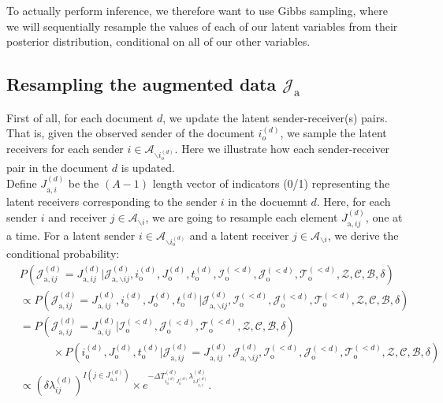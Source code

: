 \documentclass[a4paper]{article}
\begin{document}
 To actually perform inference, we therefore want to use Gibbs sampling, where we will sequentially resample the values of each of our latent variables from their posterior distribution, conditional on all of our other variables.
    \subsection{Resampling the augmented data $\mathcal{J}_{\mbox{a}}$} \label{subsec: Data augmentation}
      First of all, for each document $d$, we update the latent sender-receiver(s) pairs. That is, given the observed sender of the document $i_o^{(d)}$, we sample the latent receivers for each sender $i \in \mathcal{A}_{\backslash i_o^{(d)}}$. Here we illustrate how each sender-receiver pair in the document $d$ is updated.\\\newline
      Define ${J}^{(d)}_{\mbox{a}, i}$ be the $(A-1)$ length vector of indicators (0/1) representing the latent receivers corresponding to the sender $i$ in the docuemnt $d$. Here, for each sender $i$ and receiver  $j \in \mathcal{A}_{\backslash i}$, we are going to resample each element ${J}^{(d)}_{\mbox{a}, ij}$, one at a time. For a latent sender $i \in \mathcal{A}_{\backslash i_o^{(d)}}$ and a latent receiver $j \in \mathcal{A}_{\backslash i}$, we derive the conditional probability:\\
      \begin{equation}
      \begin{aligned}
      &P(\mathcal{J}^{(d)}_{\mbox{a}, ij} = {J}^{(d)}_{\mbox{a}, ij}|\mathcal{J}^{(d)}_{\mbox{a}, \backslash ij},   i^{(d)}_{\mbox{o}}, J^{(d)}_{\mbox{o}}, t^{(d)}_{\mbox{o}}, \mathcal{I}^{(<d)}_{\mbox{o}}, \mathcal{J}^{(<d)}_{\mbox{o}}, \mathcal{T}^{(<d)}_{\mbox{o}}, \mathcal{Z}, \mathcal{C}, \mathcal{B}, \delta)\\&\propto P(\mathcal{J}^{(d)}_{\mbox{a}, ij} ={J}^{(d)}_{\mbox{a}, ij}, i^{(d)}_{\mbox{o}}, J^{(d)}_{\mbox{o}}, t^{(d)}_{\mbox{o}}| \mathcal{J}^{(d)}_{\mbox{a}, \backslash ij}, \mathcal{I}^{(<d)}_{\mbox{o}}, \mathcal{J}^{(<d)}_{\mbox{o}}, \mathcal{T}^{(<d)}_{\mbox{o}}, \mathcal{Z}, \mathcal{C}, \mathcal{B}, \delta)
      \\&= P(\mathcal{J}^{(d)}_{\mbox{a}, ij} ={J}^{(d)}_{\mbox{a}, ij}| \mathcal{I}^{(<d)}_{\mbox{o}}, \mathcal{J}^{(<d)}_{\mbox{o}}, \mathcal{T}^{(<d)}_{\mbox{o}}, \mathcal{Z}, \mathcal{C}, \mathcal{B}, \delta)\\&\quad\quad\quad\times P(i^{(d)}_{\mbox{o}}, J^{(d)}_{\mbox{o}}, t^{(d)}_{\mbox{o}}| \mathcal{J}^{(d)}_{\mbox{a}, ij} ={J}^{(d)}_{\mbox{a}, ij},\mathcal{J}^{(d)}_{\mbox{a}, \backslash ij},  \mathcal{I}^{(<d)}_{\mbox{o}}, \mathcal{J}^{(<d)}_{\mbox{o}}, \mathcal{T}^{(<d)}_{\mbox{o}}, \mathcal{Z}, \mathcal{C}, \mathcal{B}, \delta)\\&  \propto {(\delta\lambda^{(d)}_{ij})^{I(j \in J^{(d)}_{\mbox{a}, i})}}\times  e^{-\Delta T^{(d)}_{i_o^{(d)}J_o^{(d)}}\lambda^{(d)}_{iJ^{(d)}_{\mbox{a}, i}}}.
      \end{aligned}
      \end{equation}
\end{document}
